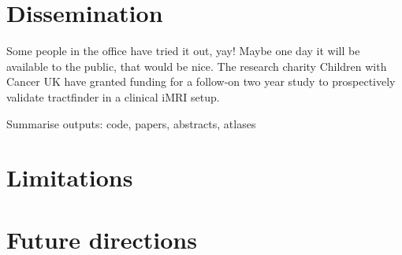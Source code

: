 \section{Dissemination}


Some people in the office have tried it out, yay!
Maybe one day it will be available to the public, that would be nice.
The research charity Children with Cancer UK have granted funding for a follow-on two year study to prospectively validate tractfinder in a clinical iMRI setup.

Summarise outputs:
code, papers, abstracts, atlases

\section{Limitations}


\section{Future directions}

